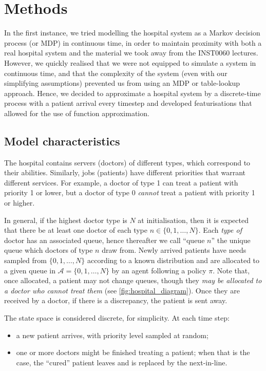 \documentclass[11point]{article}
\begin{document}
\section{Methods}

In the first instance, we tried modelling the hospital system as a Markov decision process (or MDP) in continuous time, in order to maintain proximity with both a real hospital system and the material we took away from the INST0060 lectures.
However, we quickly realised that we were not equipped to simulate a system in continuous time,
and that the complexity of the system (even with our simplifying assumptions) prevented us from using an MDP or table-lookup approach.
Hence, we decided to approximate a hospital system by a discrete-time process with a patient arrival every timestep and developed featurisations that allowed for the use of function approximation.

\subsection{Model characteristics}
The hospital contains servers (doctors) of different types, which correspond to their abilities.
Similarly, jobs (patients) have different priorities that warrant different services.
For example, a doctor of type 1 can treat a patient with priority 1 or lower, but a doctor of type 0 \emph{cannot} treat a patient with priority 1 or higher.

In general, if the highest doctor type is $N$ at initialisation, then it is expected that there be at least one doctor of each type $n\in \{0,1,\ldots,N\}$.
Each \emph{type of} doctor has an associated queue, hence thereafter we call ``queue $n$'' the unique queue which doctors of type $n$ draw from.
Newly arrived patients have needs sampled from $\{0,1,\ldots,N\}$ according to a known distribution and are allocated to a given queue in $\mathcal{A}=\{0,1,\ldots,N\}$ by an agent following a policy $\pi$.
Note that, once allocated, a patient may not change queues, though they \emph{may be allocated to a doctor who cannot treat them} (see \autoref{fig:hospital_diagram}).
Once they are received by a doctor, if there is a discrepancy, the patient is sent away.

The state space is considered discrete, for simplicity. At each time step:
\begin{itemize}[nosep]
    \item a new patient arrives, with priority level sampled at random; 
    \item one or more doctors might be finished treating a patient; when that is the case, the ``cured'' patient leaves and is replaced by the next-in-line. 
\end{itemize}
\end{document}
